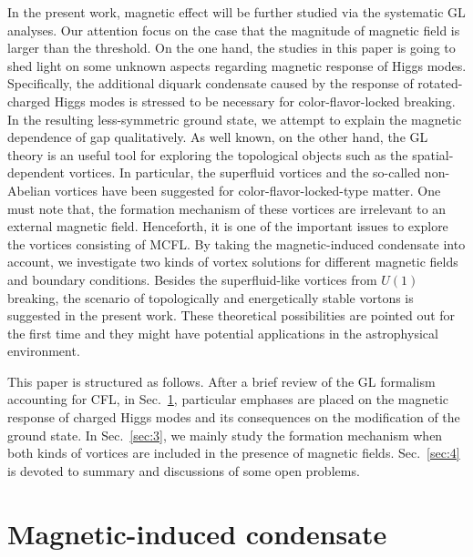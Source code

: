 In the present work, magnetic effect will be further studied via the systematic GL analyses. Our attention focus on the case that the magnitude of magnetic field is larger than the threshold. On the one hand, the studies in this paper is going to shed light on some unknown aspects regarding magnetic response of Higgs modes.
Specifically, the additional diquark condensate caused by the response of rotated-charged Higgs modes is stressed to be necessary for color-flavor-locked breaking. In the resulting less-symmetric ground state, we attempt to explain the magnetic dependence of gap qualitatively. As well known, on the other hand, the GL theory is an useful tool for exploring the topological objects such
as the spatial-dependent vortices. In particular, the superfluid vortices and the so-called non-Abelian vortices have been suggested for
color-flavor-locked-type matter.
One must note that, the formation mechanism of these vortices are irrelevant to an external magnetic
field. Henceforth, it is one of the important issues to explore the vortices consisting of MCFL. By taking
the magnetic-induced condensate into account, we investigate two kinds of vortex solutions for different magnetic
fields and boundary conditions. Besides the superfluid-like vortices from $U(1)$ breaking, the scenario of
topologically and energetically stable vortons is suggested in the present work. These theoretical possibilities
are pointed out for the first time and they might have potential applications in the astrophysical environment.

This paper is structured as follows. After a brief review of the GL formalism accounting for CFL, in
Sec.~\ref{sec:2}, particular emphases are placed on the magnetic response of charged Higgs modes and its
consequences on the modification of the ground state. In Sec.~\ref{sec:3}, we mainly study the formation
mechanism when both kinds of vortices are included in the presence of magnetic fields. Sec.~\ref{sec:4} is
devoted to summary and discussions of some open problems.

\section{Magnetic-induced condensate}
\label{sec:2}
